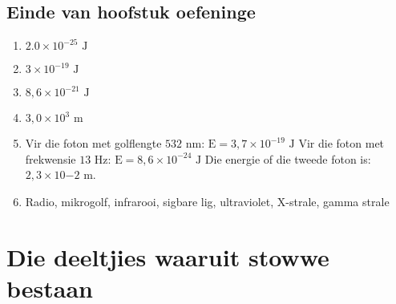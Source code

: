 \subsection{Einde van hoofstuk oefeninge} 
\begin{multicols}{2}
\begin{enumerate}[itemsep=20pt, label=\textbf{\arabic*}.]
\item $2.0 \times 10^{-25} \text{ J}$
\item $3 \times 10^{-19} \text{ J}$
\item $8,6 \times 10^{-21} \text{ J}$
\item $3,0 \times 10^{3} \text{ m}$
\item Vir die foton met golflengte $532 \text{ nm}$: $\text{E}=3,7 \times 10^{-19} \text{ J}$ \newline
Vir die foton met frekwensie $13 \text{ Hz}$: $\text{E}=8,6 \times 10^{-24} \text{ J}$ \newline
Die energie of die tweede foton is: $2,3 \times 10{-2} \text{ m}$.
\item Radio, mikrogolf, infrarooi, sigbare lig, ultraviolet, X-strale, gamma strale
\end{enumerate}
\end{multicols}

\section{Die deeltjies waaruit stowwe bestaan}
